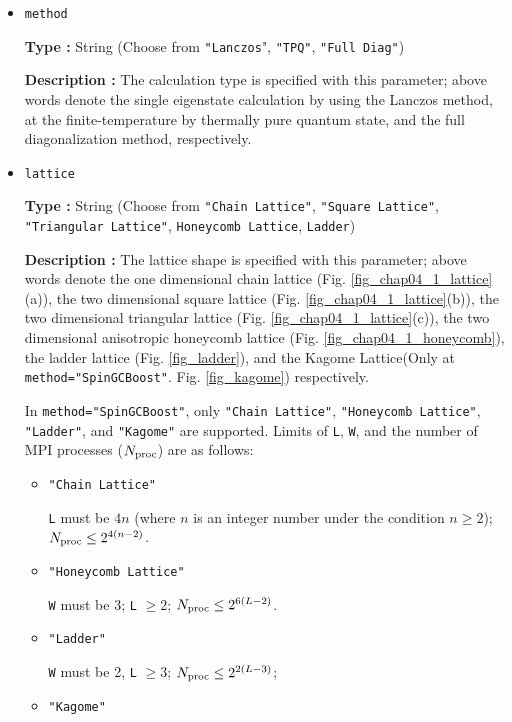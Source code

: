 \begin{itemize}
\item \verb|method|
  
{\bf Type :} String (Choose from \verb|"Lanczos|", \verb|"TPQ"|, \verb|"Full Diag"|)

{\bf Description :} The calculation type is specified with this parameter;
above words denote 
the single eigenstate calculation by using the Lanczos method,
at the finite-temperature by thermally pure quantum state,
and the full diagonalization method,
respectively.

\item \verb|lattice|

{\bf Type :} String (Choose from \verb|"Chain Lattice"|, \verb|"Square Lattice"|, 
\verb|"Triangular Lattice"|, \verb|Honeycomb Lattice|, \verb|Ladder|)

{\bf Description :} The lattice shape is specified with this parameter;
above words denote
the one dimensional chain lattice (Fig. \ref{fig_chap04_1_lattice}(a)), 
the two dimensional square lattice (Fig. \ref{fig_chap04_1_lattice}(b)),
the two dimensional triangular lattice (Fig. \ref{fig_chap04_1_lattice}(c)),
the two dimensional anisotropic honeycomb lattice (Fig. \ref{fig_chap04_1_honeycomb}),
the ladder lattice (Fig. \ref{fig_ladder}),
and
the Kagome Lattice(Only at \verb|method="SpinGCBoost"|. Fig. \ref{fig_kagome})
respectively.

In \verb|method="SpinGCBoost"|,
only \verb|"Chain Lattice"|, \verb|"Honeycomb Lattice"|, 
\verb|"Ladder"|, and \verb|"Kagome"| are supported.
Limits of \verb|L|, \verb|W|, and the number of MPI processes ($N_{\rm proc}$) are as follows:

\begin{itemize}

  \item \verb|"Chain Lattice"|

    \verb|L| must be $4n$ (where $n$ is an integer number under the condition  $n\geq2$);
    $N_{\rm proc} \leq 2^{4(n-2)}$.

  \item \verb|"Honeycomb Lattice"|

    \verb|W| must be 3; \verb|L| $\geq 2$; $N_{\rm proc} \leq 2^{6(L-2)}$.

  \item \verb|"Ladder"|

    \verb|W| must be 2, \verb|L| $\geq 3$; $N_{\rm proc} \leq 2^{2(L-3)}$;

  \item \verb|"Kagome"|


\end{itemize}
\end{itemize}

